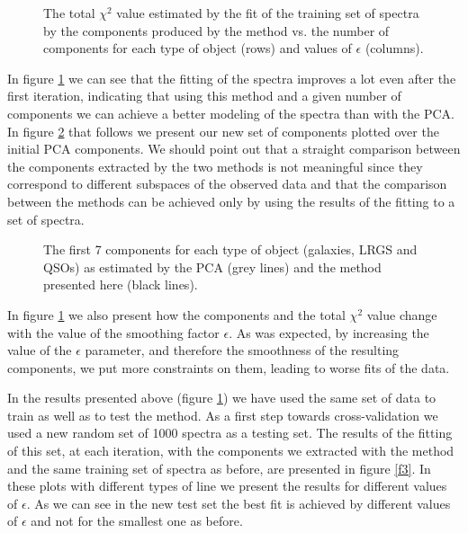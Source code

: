\documentclass[12pt,preprint]{aastex}
\begin{document}
\begin{figure}[h]
\caption{The total $\chi^2$ value estimated by the fit of the training set of spectra by the components produced by the method vs. the number of components for each type of object (rows) and values of $\epsilon$ (columns).}
\label{f1}
\end{figure}

In figure \ref{f1} we can see that the fitting of the spectra improves a lot even after the first iteration, indicating that using this method and a given number of components we can achieve a better modeling of the spectra than with the PCA. In figure \ref{f2} that follows we present our new set of components plotted over the initial PCA components. We should point out that a straight comparison between the components extracted by the two methods is not meaningful since they correspond to different subspaces of the observed data and that the comparison between the methods can be achieved only by using the results of the fitting to a set of spectra.

\begin{figure}[h]
\begin{center}
\caption{The first 7 components for each type of object (galaxies, LRGS and QSOs) as estimated by the PCA (grey lines) and the method presented here (black lines).}
\label{f2}
\end{center}
\end{figure}

In figure \ref{f1} we also present how the components and the total $\chi^2$ value change with the value of the smoothing factor $\epsilon$. As was expected, by increasing the value of the $\epsilon$ parameter, and therefore the smoothness of the resulting components, we put more constraints on them, leading to worse fits of the data.

In the results presented above (figure \ref{f1}) we have used the same set of data to train as well as to test the method. As a first step towards cross-validation we used a new random set of 1000 spectra as a testing set. The results of the fitting of this set, at each iteration, with the components we extracted with the method and the same training set of spectra as before, are presented in figure \ref{f3}. In these plots with different types of line we present the results for different values of $\epsilon$. As we can see in the new test set the best fit is achieved by different values of $\epsilon$ and not for the smallest one as before.
\end{document}
